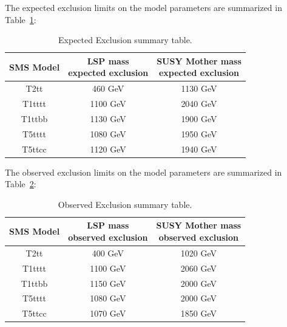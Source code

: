 The expected exclusion limits on the model parameters are summarized in Table~\ref{tab:c4limitsummary_exp}:

\begin{table}[htbp]
\fontsize{10 pt}{1.2 em}
\selectfont
\begin{centering}
\caption{\label{tab:c4limitsummary_exp} Expected Exclusion summary table.}
\hspace*{-4ex}
\begin{tabular}{|c|c|c|}
\hline
SMS Model & \specialcell{LSP mass \\ expected exclusion} & \specialcell{SUSY Mother mass \\ expected exclusion} \\
\hline
T2tt & 460 GeV & 1130 GeV \\
\hline
T1tttt & 1100 GeV & 2040 GeV \\
\hline
T1ttbb & 1130 GeV & 1900 GeV \\
\hline
T5tttt & 1080 GeV & 1950 GeV \\
\hline
T5ttcc & 1120 GeV & 1940 GeV \\
\hline
\end{tabular}
\par\end{centering}
\end{table}

The observed exclusion limits on the model parameters are summarized in Table~\ref{tab:c4limitsummary_obs}:

\begin{table}[htbp]
\fontsize{10 pt}{1.2 em}
\selectfont
\begin{centering}
\caption{\label{tab:c4limitsummary_obs} Observed Exclusion summary table.}
\hspace*{-4ex}
\begin{tabular}{|c|c|c|}
\hline
SMS Model & \specialcell{LSP mass \\ observed exclusion} & \specialcell{SUSY Mother mass \\ observed exclusion} \\
\hline
T2tt & 400 GeV & 1020 GeV \\
\hline
T1tttt & 1100 GeV & 2060 GeV \\
\hline
T1ttbb & 1150 GeV & 2000 GeV \\
\hline
T5tttt & 1080 GeV & 2000 GeV \\
\hline
T5ttcc & 1070 GeV & 1850 GeV \\
\hline
\end{tabular}
\par\end{centering}
\end{table}
